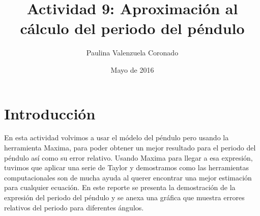 \documentclass[12pt]{article}
\title{Actividad 9: Aproximación al cálculo del periodo del péndulo}
\author{Paulina Valenzuela Coronado}
\date{Mayo de 2016}
\begin{document}
\maketitle
\section{Introducción}
En esta actividad volvimos a usar el módelo del péndulo pero usando la herramienta Maxima, para poder obtener un mejor resultado para el periodo del péndulo así como su error relativo.
Usando Maxima para llegar a esa expresión, tuvimos que aplicar una serie de Taylor y demostramos como las herramientas computacionales son de mucha ayuda al querer encontrar una mejor estimación para cualquier ecuación.
En este reporte se presenta la demostración de la expresión del periodo del péndulo y se anexa una gráfica que muestra errores relativos del periodo para diferentes ángulos.
\end{document}
